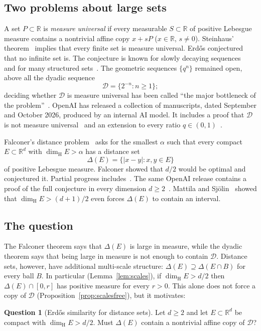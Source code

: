 \documentclass[11pt]{amsart}
\theoremstyle{definition}
\newtheorem{question}[theorem]{Question}
\theoremstyle{remark}
\newcommand{\R}{\mathbb{R}}
\newcommand{\dimH}{\dim_{\mathrm H}}
\newcommand{\Dy}{\mathcal{D}}
\begin{document}
\subsection{Two problems about large sets}
A set $P\subset\R$ is \emph{measure universal} if every measurable $S\subset\R$ of positive
Lebesgue measure contains a nontrivial affine copy $x+sP$ ($x\in\R$, $s\neq0$). Steinhaus'
theorem~\cite{Steinhaus1920} implies that every finite set is measure universal. Erd\H{o}s
conjectured~\cite{Erdos1974} that no infinite set is. The conjecture is known for slowly
decaying sequences~\cite{Falconer1984} and for many structured sets~\cite{Bourgain1987,Kolountzakis1997}.
The geometric sequences $\{q^n\}$ remained open, above all the dyadic sequence
\[
  \Dy=\{2^{-n}:n\ge1\};
\]
deciding whether $\Dy$ is measure universal has been called ``the major bottleneck of the
problem''~\cite{JungLaiMooroogen2024}. OpenAI has released a
collection of manuscripts, dated September and October 2026, produced by an internal AI model. It
includes a proof that $\Dy$ is not measure universal~\cite{OAIDyadic} and an extension to every
ratio $q\in(0,1)$~\cite{OAIGeometric}.

Falconer's distance problem~\cite{Falconer1985} asks for the smallest $\alpha$ such that every
compact $E\subset\R^d$ with $\dimH E>\alpha$ has a distance set
\[
  \Delta(E)=\{|x-y|:x,y\in E\}
\]
of positive Lebesgue measure. Falconer showed that $d/2$ would be optimal and conjectured it.
Partial progress includes~\cite{Wolff1999,Erdogan2005,GIOW2020}. The same OpenAI release contains a
proof of the full conjecture in every dimension $d\ge2$~\cite{OAIFalconer}.
Mattila and Sj\"olin~\cite{MattilaSjolin1999} showed that $\dimH E>(d+1)/2$ even forces
$\Delta(E)$ to contain an interval.

\subsection{The question}
The Falconer theorem says that $\Delta(E)$ is large in measure, while the dyadic theorem says
that being large in measure is not enough to contain $\Dy$. Distance sets, however, have
additional multi-scale structure: $\Delta(E)\supseteq\Delta(E\cap B)$ for every ball $B$. In
particular (Lemma~\ref{lem:scales}), if $\dimH E>d/2$ then $\Delta(E)\cap[0,r]$ has positive
measure for every $r>0$. This alone does not force a copy of $\Dy$
(Proposition~\ref{prop:scalesfree}), but it motivates:

\begin{question}[Erd\H{o}s similarity for distance sets]\label{q:main}
Let $d\ge2$ and let $E\subset\R^d$ be compact with $\dimH E>d/2$. Must $\Delta(E)$ contain a
nontrivial affine copy of $\Dy$?
\end{question}
\end{document}
